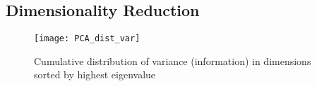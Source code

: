 \subsection*{Dimensionality Reduction}

\begin{figure}[H]
\centering
\texttt{[image: PCA\_dist\_var]}
\caption{Cumulative distribution of variance (information) in dimensions sorted by highest eigenvalue}
\label{fig:PCA_dist_rap}
\end{figure}